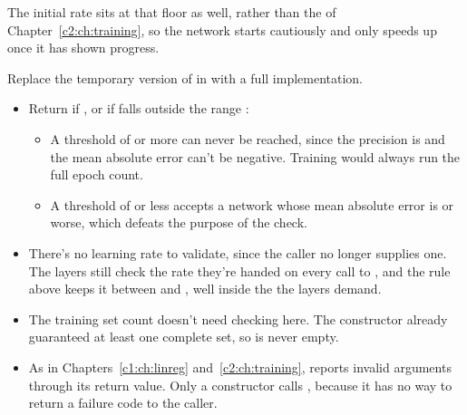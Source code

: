 The initial rate sits at that floor as well,  rather than the  of
Chapter~\ref{c2:ch:training}, so the network starts cautiously and only speeds up once it has shown
progress.

\label{c4:ex:12}
Replace the temporary version of  in 
with a full implementation.

\begin{itemize}
  \item Return  if , or if  falls outside
    the range :
  \begin{itemize}
    \item A threshold of  or more can never be reached, since the precision is
       and the mean absolute error can't be negative. Training would always run
      the full epoch count.
    \item A threshold of  or less accepts a network whose mean absolute error is
       or worse, which defeats the purpose of the check.
  \end{itemize}
  \item There's no learning rate to validate, since the caller no longer supplies one. The layers
    still check the rate they're handed on every call to , and the rule above
    keeps it between  and , well inside the  the layers
    demand.
  \item The training set count doesn't need checking here. The constructor already guaranteed at
    least one complete set, so  is never empty.
  \item As in Chapters~\ref{c1:ch:linreg} and~\ref{c2:ch:training},  reports invalid
    arguments through its return value. Only a constructor calls , because it
    has no way to return a failure code to the caller.
\end{itemize}

